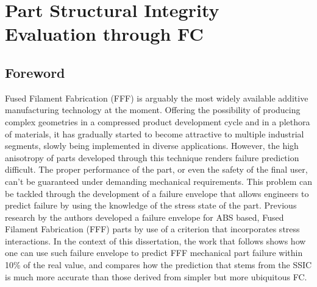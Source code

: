 \documentclass[main.tex]{subfiles}
\begin{document}
\chapter{Part Structural Integrity Evaluation through FC} \label{ch:fc_val}
\section{Foreword}
Fused Filament Fabrication (FFF) is arguably the most widely available additive manufacturing technology at the moment. Offering the possibility of producing complex geometries in a compressed product development cycle and in a plethora of materials, it has gradually started to become attractive to multiple industrial segments, slowly being implemented in diverse applications. However, the high anisotropy of parts developed through this technique renders failure prediction difficult. The proper performance of the part, or even the safety of the final user, can't be guaranteed under demanding mechanical requirements. This problem can be tackled through the development of a failure envelope that allows engineers to predict failure by using the knowledge of the stress state of the part. Previous research by the authors developed a failure envelope for ABS based, Fused Filament Fabrication (FFF) parts by use of a criterion that incorporates stress interactions. In the context of this dissertation, the work that follows shows how one can use such failure envelope to predict FFF mechanical part failure within 10\% of the real value, and compares how the prediction that stems from the SSIC is much more accurate than those derived from simpler but more ubiquitous FC.
\end{document}

